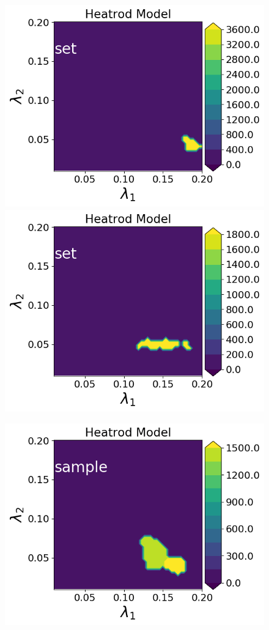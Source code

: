 \begin{figure}[h]
\begin{minipage}{.4\textwidth}
\includegraphics[width=\linewidth]{examples/fig_heatrod_q2/HeatrodModel--set_N50_em.png}
\includegraphics[width=\linewidth]{examples/fig_heatrod_q2/HeatrodModel--set_N500_em.png}
\end{minipage}
\begin{minipage}{.4\textwidth}
\includegraphics[width=\linewidth]{examples/fig_heatrod_q1/HeatrodModel--sample_N50_mc.png}

\end{minipage}
\end{figure}
